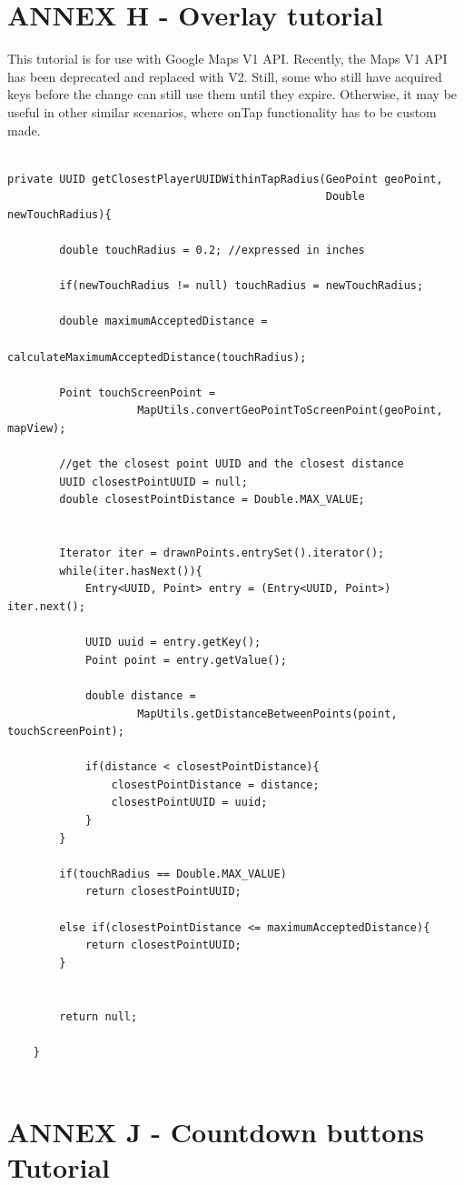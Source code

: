\documentclass{article}
\begin{document}
\section{ANNEX H - Overlay tutorial}

This tutorial is for use with Google Maps V1 API. Recently, the Maps V1 API has
been deprecated and replaced with V2. Still, some who still have acquired keys
before the change can still use them until they expire. Otherwise, it
may be useful in other similar scenarios, where onTap functionality
has to be custom made.\newline
\begin{verbatim}

private UUID getClosestPlayerUUIDWithinTapRadius(GeoPoint geoPoint,
												 Double newTouchRadius){
		
		double touchRadius = 0.2; //expressed in inches
		
		if(newTouchRadius != null) touchRadius = newTouchRadius;		 
				
		double maximumAcceptedDistance = 
								calculateMaximumAcceptedDistance(touchRadius);
		
		Point touchScreenPoint = 
					MapUtils.convertGeoPointToScreenPoint(geoPoint, mapView);
		
		//get the closest point UUID and the closest distance
		UUID closestPointUUID = null;
		double closestPointDistance = Double.MAX_VALUE;
			
		
		Iterator iter = drawnPoints.entrySet().iterator();
		while(iter.hasNext()){			
			Entry<UUID, Point> entry = (Entry<UUID, Point>) iter.next();
			
			UUID uuid = entry.getKey();
			Point point = entry.getValue();
			
			double distance = 
					MapUtils.getDistanceBetweenPoints(point, touchScreenPoint);
			
			if(distance < closestPointDistance){
				closestPointDistance = distance;
				closestPointUUID = uuid;		
			}
		}
		
		if(touchRadius == Double.MAX_VALUE) 
			return closestPointUUID;
		
		else if(closestPointDistance <= maximumAcceptedDistance){
			return closestPointUUID;
		}
		
		
		return null;
		
	}
	
\end{verbatim}


\section{ANNEX J - Countdown buttons Tutorial}
\end{document}
